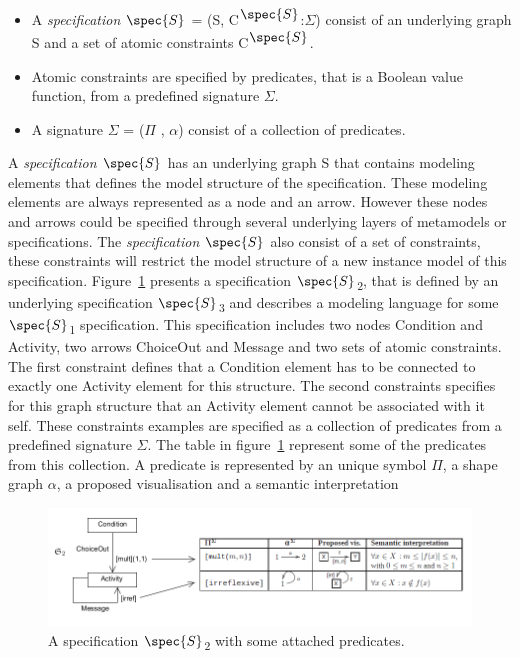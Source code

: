 \begin{itemize}
  
\item A \emph{specification $\spec{S}$} = (S,
C\textsuperscript{$\spec{S}$}:$\Sigma$) consist of an underlying graph S and a
set of atomic constraints C\textsuperscript{$\spec{S}$}. 

\item Atomic constraints are specified by predicates, that is a Boolean value
function, from a predefined signature $\Sigma$.

\item A signature $\Sigma$ = ($\Pi$ \hspace{1 mm}, \hspace{1 mm}$\alpha$)
consist of a collection of predicates. 
  
\end{itemize}

A \emph{specification $\spec{S}$} has an underlying graph S that contains
modeling elements that defines the model structure of the specification. These
modeling elements are always represented as a node and an arrow. However these
nodes and arrows could be specified through several underlying layers of
metamodels or specifications. The \emph{specification $\spec{S}$} also consist
of a set of constraints, these constraints will restrict the model structure of
a new instance model of this specification. Figure~\ref{fig:DPF_Spec} presents a
specification $\spec{S}$\textsubscript{2}, that is defined by an underlying
specification $\spec{S}$\textsubscript{3} and describes a modeling language for
some $\spec{S}$\textsubscript{1} specification. This specification includes two
nodes Condition and Activity, two arrows ChoiceOut and Message and  two sets of
atomic constraints. The first constraint defines that a Condition element has
to be connected to exactly one Activity element for this structure. The second
constraints specifies for this graph structure that an Activity element cannot
be associated with it self. These constraints examples are specified as a
collection of predicates from a predefined signature $\Sigma$. The table in
figure~\ref{fig:DPF_Spec} represent some of the predicates from this
collection. A predicate is represented by an unique symbol $\Pi$, a shape graph
$\alpha$, a proposed visualisation and a semantic interpretation

\begin{figure}[H]
	\centering
	\includegraphics[scale=0.7]{./Figures/DPF_spec_constraints.png}
	\caption[A specification and some predefined diagrammatic predicate attached]
	{A specification $\spec{S}$\textsubscript{2} with some attached predicates.}
	\label{fig:DPF_Spec}
\end{figure}

